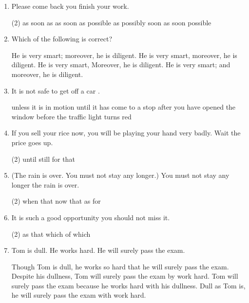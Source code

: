 \begin{enumerate}
\item Please come back \ttu you finish your work.
\begin{tasks}(2)
  \task as soon as
  \task as soon as possible
  \task as possibly soon
  \task as soon possible
\end{tasks}

\item Which of the following is correct?
\begin{tasks}
  \task He is very smart; moreover, he is diligent.
  \task He is very smart, moreover, he is diligent.
  \task He is very smart, Moreover, he is diligent.
  \task He is very smart; and moreover, he is diligent.
\end{tasks}

\item It is not safe to get off a car \ttu.
\begin{tasks}
  \task unless it is in motion
  \task until it has come to a stop
  \task after you have opened the window
  \task before the traffic light turns red
\end{tasks}

\item If you sell your rice now, you will be playing your hand very badly. Wait \ttu the price goes up.
\begin{tasks}(2)
  \task until
  \task still
  \task for
  \task that
\end{tasks}

\item (The rain is over. You must not stay any longer.) You must not stay any longer \ttu the rain is over.
\begin{tasks}(2)
  \task when
  \task that
  \task now that
  \task as for
\end{tasks}

\item It is such a good opportunity \ttu you should not miss it.
\begin{tasks}(2)
  \task as
  \task that
  \task which
  \task of which
\end{tasks}

\item Tom is dull. He works hard. He will surely pass the exam.
\begin{tasks}
  \task Though Tom is dull, he works so hard that he will surely pass the exam.
  \task Despite his dullness, Tom will surely pass the exam by work hard.
  \task Tom will surely pass the exam because he works hard with his dullness.
  \task Dull as Tom is, he will surely pass the exam with work hard.
\end{tasks}


\end{enumerate}
